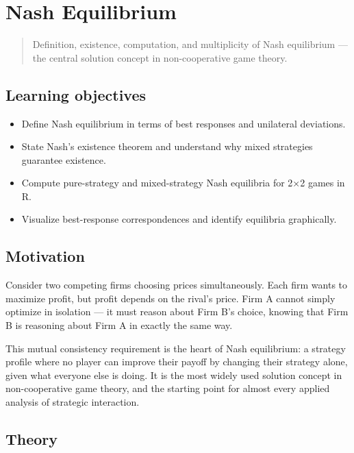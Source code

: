 \documentclass[
]{article}
\author{}
\date{\vspace{-2.5em}}
\providecommand{\tightlist}{%
  \setlength{\itemsep}{0pt}\setlength{\parskip}{0pt}}
\begin{document}
\section{Nash Equilibrium}\label{sec-nash-equilibrium}

\begin{quote}
Definition, existence, computation, and multiplicity of Nash equilibrium
--- the central solution concept in non-cooperative game theory.
\end{quote}

\subsection*{Learning objectives}\label{learning-objectives}

\begin{itemize}
\tightlist
\item
  Define Nash equilibrium in terms of best responses and unilateral
  deviations.
\item
  State Nash's existence theorem and understand why mixed strategies
  guarantee existence.
\item
  Compute pure-strategy and mixed-strategy Nash equilibria for 2×2 games
  in R.
\item
  Visualize best-response correspondences and identify equilibria
  graphically.
\end{itemize}

\subsection{Motivation}\label{motivation}

Consider two competing firms choosing prices simultaneously. Each firm
wants to maximize profit, but profit depends on the rival's price. Firm
A cannot simply optimize in isolation --- it must reason about Firm B's
choice, knowing that Firm B is reasoning about Firm A in exactly the
same way.

This mutual consistency requirement is the heart of Nash equilibrium: a
strategy profile where no player can improve their payoff by changing
their strategy alone, given what everyone else is doing. It is the most
widely used solution concept in non-cooperative game theory, and the
starting point for almost every applied analysis of strategic
interaction.

\subsection{Theory}\label{theory}
\end{document}
